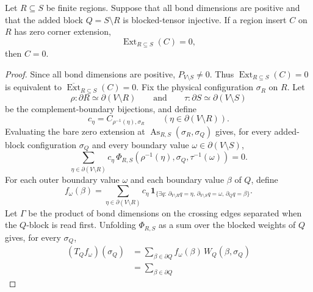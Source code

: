 \begin{theorem}
    \label{thm:peps_extend_insert_kernel_trivial_added_injective}
    \leanok
    Let $R\subseteq S$ be finite regions.  Suppose that all bond dimensions are
    positive and that the added block $Q=S\setminus R$ is blocked-tensor
    injective.  If a region insert $C$ on $R$ has zero corner extension,
    \[
        \operatorname{Ext}_{R\subseteq S}(C)=0,
    \]
    then $C=0$.
\end{theorem}
\begin{proof}
    \leanok
    Since all bond dimensions are positive, $P_{V\setminus S}\ne 0$.
    Thus $\operatorname{Ext}_{R\subseteq S}(C)=0$ is equivalent to
    $\overline{\operatorname{Ext}}_{R\subseteq S}(C)=0$.  Fix the physical
    configuration $\sigma_R$ on $R$.  Let
    \[
        \rho:\partial R \simeq \partial(V\setminus R)
        \qquad\text{and}\qquad
        \tau:\partial S \simeq \partial(V\setminus S)
    \]
    be the complement-boundary bijections, and define
    \[
        c_\eta=C_{\rho^{-1}(\eta),\sigma_R}
        \qquad(\eta\in \partial(V\setminus R)).
    \]
    Evaluating the bare zero extension at
    $\operatorname{As}_{R,S}(\sigma_R,\sigma_Q)$ gives, for every added-block
    configuration $\sigma_Q$ and every boundary value
    $\omega\in\partial(V\setminus S)$,
    \[
        \sum_{\eta\in\partial(V\setminus R)}
        c_\eta\,\Phi_{R,S}(\rho^{-1}(\eta),\sigma_Q,\tau^{-1}(\omega))=0.
    \]
    For each outer boundary value $\omega$ and each boundary value $\beta$ of $Q$,
    define
    \[
        f_\omega(\beta)
        =
        \sum_{\eta\in\partial(V\setminus R)}
        c_\eta\,
        \mathbf 1_{\{\exists q:\,
            \partial_{V\setminus R}q=\eta,\,
            \partial_{V\setminus S}q=\omega,\,
            \partial_Qq=\beta\}}.
    \]
    Let $\Gamma$ be the product of bond dimensions on the crossing edges
    separated when the $Q$-block is read first.  Unfolding $\Phi_{R,S}$ as a sum
    over the blocked weights of $Q$ gives, for every $\sigma_Q$,
    \[
    \begin{aligned}
        (T_Q f_\omega)(\sigma_Q)
        &=
        \sum_{\beta\in\partial Q} f_\omega(\beta)\,W_Q(\beta,\sigma_Q) \\
        &=
        \sum_{\beta\in\partial Q}

\end{aligned}\]
\end{proof}
